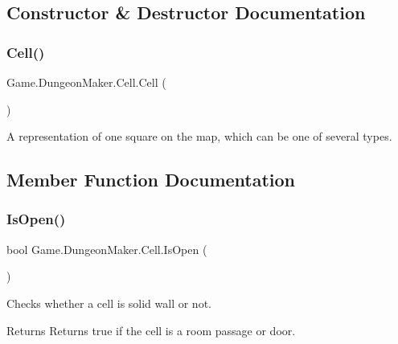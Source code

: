 \subsection{Constructor \& Destructor Documentation}
\mbox{\label{class_game_1_1_dungeon_maker_1_1_cell_a172d3f97d797bba46dd27cf2e5c04c87}} 
\subsubsection{\texorpdfstring{Cell()}{Cell()}}
{\footnotesize\ttfamily Game.\+Dungeon\+Maker.\+Cell.\+Cell (\begin{DoxyParamCaption}{ }\end{DoxyParamCaption})}



A representation of one square on the map, which can be one of several types. 



\subsection{Member Function Documentation}
\mbox{\label{class_game_1_1_dungeon_maker_1_1_cell_aef83c7358aea7dfc626b2375de6848d1}} 
\subsubsection{\texorpdfstring{Is\+Open()}{IsOpen()}}
{\footnotesize\ttfamily bool Game.\+Dungeon\+Maker.\+Cell.\+Is\+Open (\begin{DoxyParamCaption}{ }\end{DoxyParamCaption})}



Checks whether a cell is solid wall or not. 

\begin{DoxyReturn}{Returns}
Returns true if the cell is a room passage or door.
\end{DoxyReturn}
\mbox{\label{class_game_1_1_dungeon_maker_1_1_cell_ad3b5ac0a0e3376f1661b35c4d10c5116}} 
